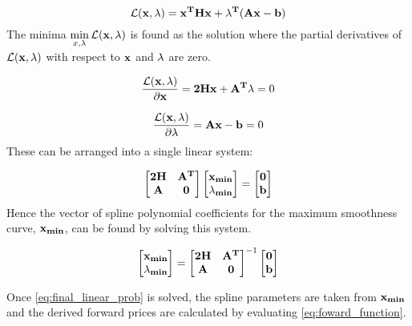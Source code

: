 \documentclass{article}
\begin{document}
\begin{equation}
    \mathcal{L}(\mathbf{x, \lambda}) = \mathbf{x^THx + \lambda^T(Ax - b)}
\end{equation}
The minima $\displaystyle\min_{x, \lambda}\mathcal{L}(\mathbf{x, \lambda})$ is found as the solution
where the partial derivatives of $\mathcal{L}(\mathbf{x, \lambda})$ with respect to $\mathbf{x}$ and $\mathbf{\lambda}$
are zero.

\begin{equation}
    \frac{\mathcal{L}(\mathbf{x, \lambda})}{\partial{\ensuremath{\mathbf{x}}}} = \mathbf{2Hx + A^T\lambda} = 0
\end{equation}

\begin{equation}
    \frac{\mathcal{L}(\mathbf{x, \lambda})}{\partial{\ensuremath{\mathbf{\lambda}}}} = \mathbf{Ax - b} = 0
\end{equation}
These can be arranged into a single linear system:

\begin{equation}
    \begin{bmatrix}
        \mathbf{2H} & \mathbf{A^T} \\
        \mathbf{A} & \mathbf{0}
    \end{bmatrix}
    \begin{bmatrix}
        \mathbf{x_{min}} \\
        \mathbf{\lambda_{min}}
    \end{bmatrix} = 
    \begin{bmatrix}
        \mathbf{0} \\
        \mathbf{b}
    \end{bmatrix}
\end{equation}
Hence the vector of spline polynomial coefficients for the maximum smoothness curve, $\mathbf{x_{min}}$,
can be found by solving this system.

\begin{equation}
    \label{eq:final_linear_prob}
    \begin{bmatrix}
        \mathbf{x_{min}} \\
        \mathbf{\lambda_{min}}
    \end{bmatrix} = 
    \begin{bmatrix}
        \mathbf{2H} & \mathbf{A^T} \\
        \mathbf{A} & \mathbf{0}
    \end{bmatrix}^{-1}
    \begin{bmatrix}
        \mathbf{0} \\
        \mathbf{b}
    \end{bmatrix}
\end{equation}

Once \ref{eq:final_linear_prob} is solved, the spline parameters are taken from $\mathbf{x_{min}}$
and the derived forward prices are calculated by evaluating \ref{eq:foward_function}.





\end{document}
